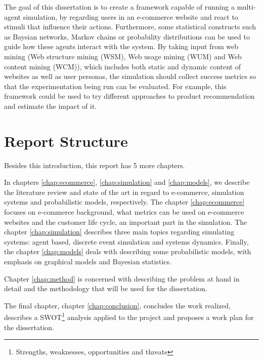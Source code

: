 The goal of this dissertation is to create a framework capable of running a
multi-agent simulation, by regarding users in an e-commerce website and react
to stimuli that influence their actions. Furthermore, some statistical 
constructs such as Baysian networks, Markov chains or probability distributions 
can be used to guide how these agents interact with the system. By taking input 
from web mining (Web structure mining (WSM), Web usage mining (WUM) and
Web content mining (WCM)), which includes both static and dynamic content
of websites as well as user personas, the simulation should collect success 
metrics so that the experimentation being run can be evaluated. For example, 
this framework could be used to try different approaches to product 
recommendation and estimate the impact of it.


\section{Report Structure} \label{sec:struct}

Besides this introduction, this report has 5 more chapters.

In chapters \ref{chap:ecommerce}, \ref{chap:simulation} and \ref{chap:models}, 
we describe the literature review and state of the art in regard to e-commerce, 
simulation systems and probabilistic models, respectively. The chapter 
\ref{chap:ecommerce} focuses on e-commerce background, what metrics can be used 
on e-commerce websites and the customer life cycle, an important part in the 
simulation. The chapter \ref{chap:simulation} describes three main topics 
regarding simulating systems: agent based, discrete event simulation and 
systems dynamics. Finally, the chapter \ref{chap:models} deals with describing 
some probabilistic models, with emphasis on graphical models and Bayesian 
statistics.

Chapter \ref{chap:method} is concerned with describing the problem at hand in 
detail and the methodology that will be used for the dissertation.

The final chapter, chapter \ref{chap:conclusion}, concludes the work realized, 
describes a SWOT\footnote{Strengths, weaknesses, opportunities and threats} 
analysis applied to the project and proposes a work plan for the dissertation.
